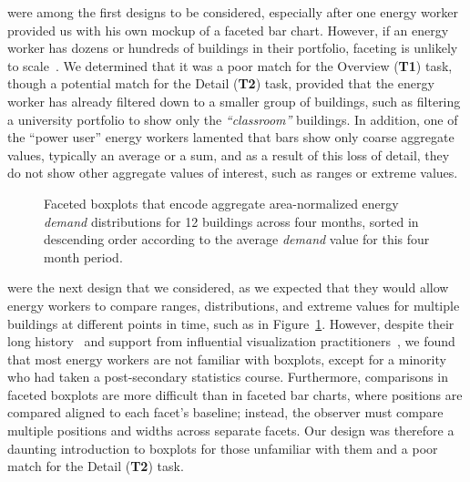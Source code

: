 \documentclass[journal]{vgtc}                %
\newcommand{\bqstart}[1]{\vspace{1mm} \noindent{\textbf{#1}}}
\begin{document}
\bqstart{Faceted bar charts} were among the first designs to be considered, especially after one energy worker provided us with his own mockup of a faceted bar chart.
However, if an energy worker has dozens or hundreds of buildings in their portfolio, faceting is unlikely to scale~\cite{Javed2010}. 
We determined that it was a poor match for the Overview ({\bf T1}) task, though a potential match for the Detail ({\bf T2}) task, provided that the energy worker has already filtered down to a smaller group of buildings, such as filtering a university portfolio to show only the {\it ``classroom''} buildings.
In addition, one of the ``power user'' energy workers lamented that bars show only coarse aggregate values, typically an average or a sum, and as a result of this loss of detail, they do not show other aggregate values of interest, such as ranges or extreme values.

\begin{figure}[ht]
	\centering
	\vspace{-0.15cm}
	\caption{Faceted boxplots that encode aggregate area-normalized energy \textsl{demand} distributions for 12 buildings across four months, sorted in descending order according to the average \textsl{demand} value for this four month period.}
	\label{fig:sandbox-faceted-boxplot}
	\vspace{-0.6cm}
\end{figure} 

\bqstart{Faceted boxplots} were the next design that we considered, as we expected that they would allow energy workers to compare ranges, distributions, and extreme values for multiple buildings at different points in time, such as in Figure~\ref{fig:sandbox-faceted-boxplot}.
However, despite their long history~\cite{Wickham2011} and support from influential visualization practitioners~\cite{Few2014}, we found that most energy workers are not familiar with boxplots, except for a minority who had taken a post-secondary statistics course.
Furthermore, comparisons in faceted boxplots are more difficult than in faceted bar charts, where  positions are compared aligned to each facet's baseline; instead, the observer must compare multiple positions and widths across separate facets. 
Our design was therefore a daunting introduction to boxplots for those unfamiliar with them and a poor match for the Detail ({\bf T2}) task.
\end{document}
